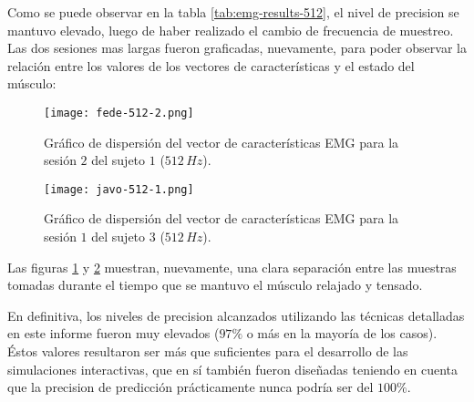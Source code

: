 Como se puede observar en la tabla \ref{tab:emg-results-512}, el nivel de precision se mantuvo elevado, luego de haber realizado el cambio de frecuencia de muestreo. Las dos sesiones mas largas fueron graficadas, nuevamente, para poder observar la relación entre los valores de los vectores de características y el estado del músculo:

\begin{figure}[H]
	\centering
    \texttt{[image: fede-512-2.png]}
    \caption{Gráfico de dispersión del vector de características EMG para la sesión $2$ del sujeto $1$ ($512\,Hz$).}
	\label{fig:emg-graph-s1s2-512}
\end{figure}

\begin{figure}[H]
	\centering
    \texttt{[image: javo-512-1.png]}
    \caption{Gráfico de dispersión del vector de características EMG para la sesión $1$ del sujeto $3$ ($512\,Hz$).}
	\label{fig:emg-graph-s3s1-512}
\end{figure}

Las figuras \ref{fig:emg-graph-s1s2-512} y \ref{fig:emg-graph-s3s1-512} muestran, nuevamente, una clara separación entre las muestras tomadas durante el tiempo que se mantuvo el músculo relajado y tensado.

En definitiva, los niveles de precision alcanzados utilizando las técnicas detalladas en este informe fueron muy elevados ($97\%$ o más en la mayoría de los casos). Éstos valores resultaron ser más que suficientes para el desarrollo de las simulaciones interactivas, que en sí también fueron diseñadas teniendo en cuenta que la precision de predicción prácticamente nunca podría ser del $100\%$.